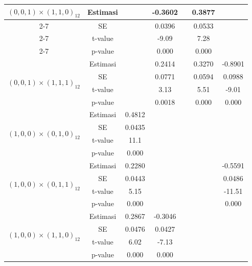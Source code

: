 \begin{enumerate}[label=\alph*.]
\begin{longtable}{|c|c|c|c|c|c|c|}
            \multirow{4}{*}{$(0,0,1)\times(1,1,0)_{12}$}
            & Estimasi &  & -0.3602 &  & 0.3877 &  \\ \cline{2-7}
            & SE       &  & 0.0396  &  & 0.0533 &  \\ \cline{2-7}
            & t-value  &  & -9.09   &  & 7.28   &  \\ \cline{2-7}
            & p-value  &  & 0.000   &  & 0.000  &  \\ \hline

            \multirow{4}{*}{$(0,0,1)\times(1,1,1)_{12}$}
            & Estimasi &  & 0.2414 &  & 0.3270 & -0.8901 \\ \cline{2-7}
            & SE       &  & 0.0771 &  & 0.0594 & 0.0988  \\ \cline{2-7}
            & t-value  &  & 3.13   &  & 5.51   & -9.01  \\ \cline{2-7}
            & p-value  &  & 0.0018 &  & 0.000  & 0.000  \\ \hline

            \multirow{4}{*}{$(1,0,0)\times(0,1,0)_{12}$}
            & Estimasi & 0.4812 &  &  &  &  \\ \cline{2-7}
            & SE       & 0.0435 &  &  &  &  \\ \cline{2-7}
            & t-value  & 11.1   &  &  &  &  \\ \cline{2-7}
            & p-value  & 0.000  &  &  &  &  \\ \hline

            \multirow{4}{*}{$(1,0,0)\times(0,1,1)_{12}$}
            & Estimasi & 0.2280 &  &  &  & -0.5591 \\ \cline{2-7}
            & SE       & 0.0443 &  &  &  & 0.0486  \\ \cline{2-7}
            & t-value  & 5.15   &  &  &  & -11.51 \\ \cline{2-7}
            & p-value  & 0.000  &  &  &  & 0.000  \\ \hline

            \multirow{4}{*}{$(1,0,0)\times(1,1,0)_{12}$}
            & Estimasi & 0.2867 & -0.3046 &  &  &  \\ \cline{2-7}
            & SE       & 0.0476 & 0.0427  &  &  &  \\ \cline{2-7}
            & t-value  & 6.02   & -7.13   &  &  &  \\ \cline{2-7}
            & p-value  & 0.000  & 0.000   &  &  &  \\ \hline


\end{longtable}
\end{enumerate}
